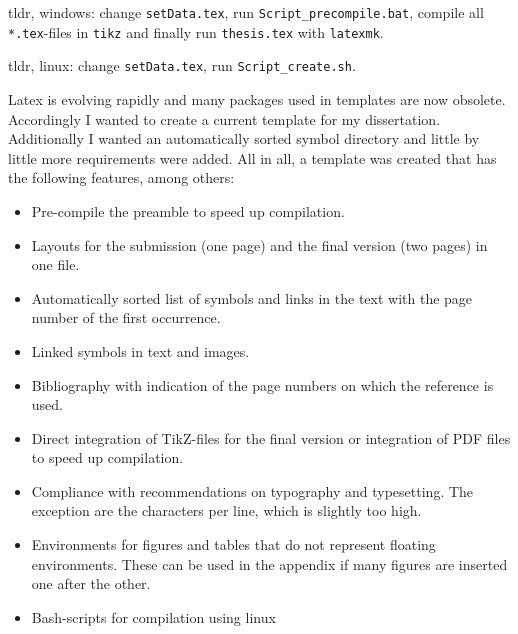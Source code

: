 
tldr, windows: change \texttt{setData.tex}, run \texttt{Script\_precompile.bat}, compile all \texttt{*.tex}-files in \texttt{tikz} and finally run \texttt{thesis.tex} with \texttt{latexmk}.

tldr, linux: change \texttt{setData.tex}, run \texttt{Script\_create.sh}.

Latex is evolving rapidly and many packages used in templates are now obsolete. Accordingly I wanted to create a current template for my dissertation. Additionally I wanted an automatically sorted symbol directory and little by little more requirements were added. All in all, a template was created that has the following features, among others:

\begin{itemize}
	\item Pre-compile the preamble to speed up compilation.
	\item Layouts for the submission (one page) and the final version (two pages) in one file.
	\item Automatically sorted list of symbols and links in the text with the page number of the first occurrence.
	\item Linked symbols in text and images.
	\item Bibliography with indication of the page numbers on which the reference is used.
	\item Direct integration of TikZ-files for the final version or integration of PDF files to speed up compilation.
	\item Compliance with recommendations on typography and typesetting. The exception are the characters per line, which is slightly too high.
	\item Environments for figures and tables that do not represent floating environments. These can be used in the appendix if many figures are inserted one after the other.
	\item Bash-scripts for compilation using linux
\end{itemize}